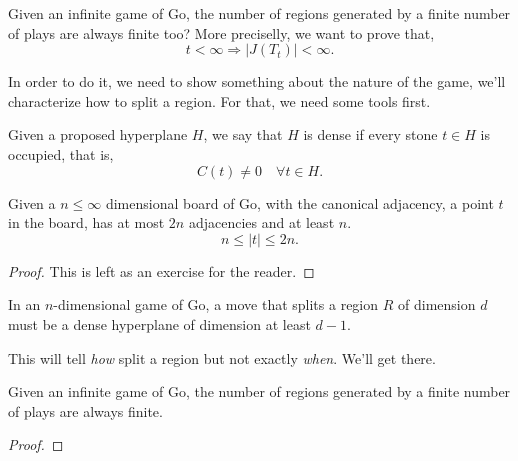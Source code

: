 Given an infinite game of Go, the number of regions generated by a finite number of plays are always finite too?
More preciselly, we want to prove that,
$$t < \infty \Rightarrow |J(T_t)|<\infty.$$

In order to do it, we need to show something about the nature of the game, we'll characterize how to split a region. For that, we need some tools first.

\begin{definition}
	Given a proposed hyperplane $H$, we say that $H$ is dense
	if every stone $t\in H$ is occupied, that is,
	$$C(t)\neq 0 \quad \forall t\in H.$$
\end{definition}

\begin{lemma}\label{lem_2n}
	Given a $n\leq \infty$ dimensional board of Go, with the canonical adjacency, a point $t$ in the board, has at most $2n$ adjacencies and at least $n$.
	$$n \leq |t|\leq 2n.$$
\end{lemma}
\begin{proof}
	This is left as an exercise for the reader.
\end{proof}








\begin{theorem}\label{lem_bigplays}
	In an $n$-dimensional game of Go, a move that splits a
	region $R$ of dimension $d$ must be a dense hyperplane
	of dimension at least $d-1$.
\end{theorem}
This will tell \textit{how} split a region but not exactly \textit{when}. We'll get there.







\begin{theorem}
	Given an infinite game of Go, the number of regions generated by a finite number of plays are always finite.
\end{theorem}
\begin{proof}
	
\end{proof}

